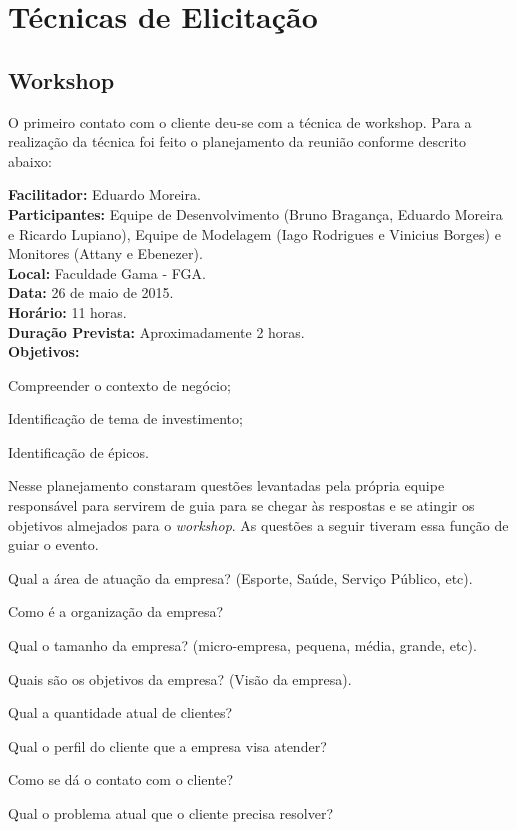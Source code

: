 \section{Técnicas de Elicitação}
	\subsection{Workshop}
		O primeiro contato com o cliente deu-se com a técnica de workshop. Para a realização da técnica foi feito o planejamento da reunião conforme descrito abaixo:

		\textbf{Facilitador: }Eduardo Moreira.\\
		\textbf{Participantes: }Equipe de Desenvolvimento (Bruno Bragança, Eduardo Moreira e Ricardo Lupiano), Equipe de Modelagem (Iago Rodrigues e Vinicius Borges) e Monitores (Attany e Ebenezer).\\
		\textbf{Local: }Faculdade Gama - FGA.\\
		\textbf{Data: }26 de maio de 2015.\\
		\textbf{Horário: }11 horas.\\
		\textbf{Duração Prevista: }Aproximadamente 2 horas.\\
		\textbf{Objetivos:}\\
		\begin{itemize}
		{
			\item Compreender o contexto de negócio;
			\item Identificação de tema de investimento;
			\item Identificação de épicos.
		}
		\end{itemize}

		Nesse planejamento constaram questões levantadas pela própria equipe responsável para servirem de guia para se chegar às respostas e se atingir os objetivos almejados para o \textit{workshop}. As questões a seguir tiveram essa função de guiar o evento.

		\begin{itemize}
		{
			\item Qual a área de atuação da empresa? (Esporte, Saúde, Serviço Público, etc).
			\item Como é a organização da empresa?
			\item Qual o tamanho da empresa? (micro-empresa, pequena, média, grande, etc).
			\item Quais são os objetivos da empresa? (Visão da empresa).
			\item Qual a quantidade atual de clientes?
			\item Qual o perfil do cliente que a empresa visa atender?
			\item Como se dá o contato com o cliente?
			\item Qual o problema atual que o cliente precisa resolver?
		}
		\end{itemize}

